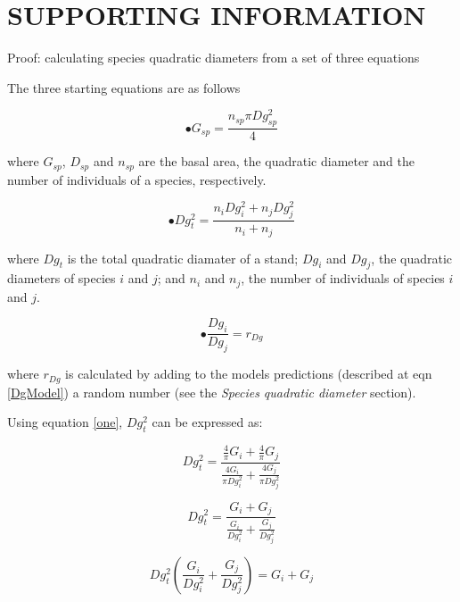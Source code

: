 \documentclass[a4paper]{article}
\begin{document}
\section*{SUPPORTING INFORMATION}


\clearpage

\noindent Proof: calculating species quadratic diameters from a set of three equations

\noindent The three starting equations are as follows

\begin{equation}\label{one}\tag{1}
  \bullet G_{sp} = \frac{n_{sp}\pi Dg_{sp}^2}{4}
\end{equation}

\noindent where $G_{sp}$, $D_{sp}$ and $n_{sp}$ are the basal area, the quadratic diameter and the number of individuals of a species, respectively.

\begin{equation}\label{}\tag{2}
  \bullet Dg_t^2 = \frac{n_iDg_i^2 + n_jDg_j^2}{n_i + n_j}
\end{equation}

\noindent where $Dg_t$ is the total quadratic diamater of a stand; $Dg_i$ and $Dg_j$, the quadratic diameters of species $i$ and $j$; and $n_i$ and $n_j$, the number of individuals of species $i$ and $j$.

\begin{equation}\label{three}\tag{3}
  \bullet \frac{Dg_i}{Dg_j} = r_{Dg}
\end{equation}

\noindent where $r_{Dg}$ is calculated by adding to the models predictions (described at eqn \ref{DgModel}) a random number (see the \textit{Species quadratic diameter} section).

\hfill

\noindent Using equation \ref{one}, $Dg_t^2$ can be expressed as:

\begin{equation*}\label{}
  Dg_t^2 = \frac{\frac{4}{\pi}G_i + \frac{4}{\pi}G_j}{\frac{4G_i}{\pi Dg_i^2} + \frac{4G_j}{\pi Dg_j^2}}
\end{equation*}

\begin{equation*}\label{}
  Dg_t^2 = \frac{G_i + G_j} {\frac{G_i}{Dg_i^2} + \frac{G_j}{Dg_j^2}}
\end{equation*}

\begin{equation*}\label{}
  Dg_t^2(\frac{G_i}{Dg_i^2} + \frac{G_j}{Dg_j^2})= G_i + G_j
\end{equation*}
\end{document}
